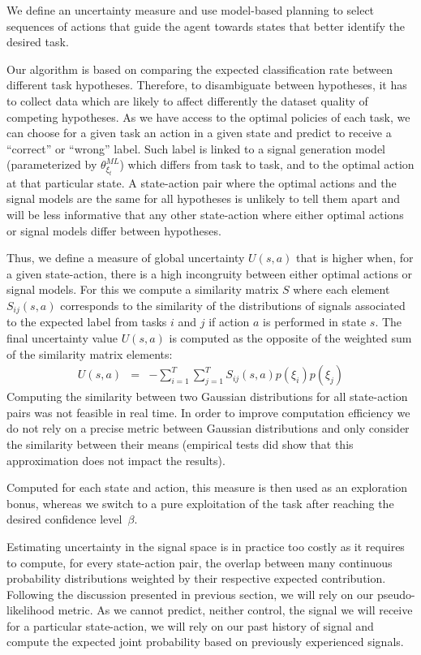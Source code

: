 We define an uncertainty measure and use model-based planning to select sequences of actions that guide the agent towards states that better identify the desired task.

Our algorithm is based on comparing the expected classification rate between different task hypotheses. Therefore, to disambiguate between hypotheses, it has to collect data which are likely to affect differently the dataset quality of competing hypotheses. As we have access to the optimal policies of each task, we can choose for a given task an action in a given state and predict to receive a ``correct'' or ``wrong'' label. Such label is linked to a signal generation model (parameterized by $\theta^{ML}_{\xi_t}$) which differs from task to task, and to the optimal action at that particular state. A state-action pair where the optimal actions and the signal models are the same for all hypotheses is unlikely to tell them apart and will be less informative that any other state-action where either optimal actions or signal models differ between hypotheses.

Thus, we define a measure of global uncertainty $U(s,a)$ that is higher when, for a given state-action, there is a high incongruity between either optimal actions or signal models. For this we compute a similarity matrix $S$ where each element $S_{ij}(s,a)$ corresponds to the similarity of the distributions of signals associated to the expected label from tasks $i$ and $j$ if action $a$ is performed in state $s$. The final uncertainty value $U(s,a)$ is computed as the opposite of the weighted sum of the similarity matrix elements:
%
\begin{eqnarray}
U(s,a) &=& - \sum_{i = 1}^{T} \sum_{j = 1}^{T} S_{ij}(s,a) p(\xi_i)p(\xi_j)
\end{eqnarray}
%
Computing the similarity between two Gaussian distributions for all state-action pairs was not feasible in real time. In order to improve computation efficiency we do not rely on a precise metric between Gaussian distributions and only consider the similarity between their means (empirical tests did show that this approximation does not impact the results).

Computed for each state and action, this measure is then used as an exploration bonus, whereas we switch to a pure exploitation of the task after reaching the desired confidence level~$\beta$.


Estimating uncertainty in the signal space is in practice too costly as it requires to compute, for every state-action pair, the overlap between many continuous probability distributions weighted by their respective expected contribution. Following the discussion presented in previous section, we will rely on our pseudo-likelihood metric. As we cannot predict, neither control, the signal we will receive for a particular state-action, we will rely on our past history of signal and compute the expected joint probability based on previously experienced signals.

